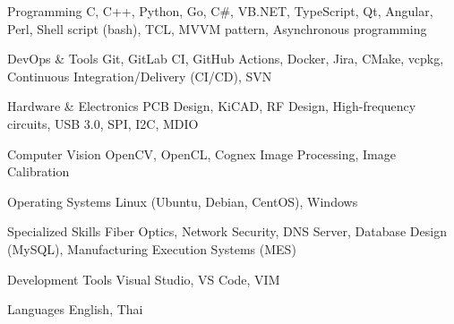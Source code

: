 
\begin{cvskills}

  \cvskill
    {Programming} %
    {C, C++, Python, Go, C\#, VB.NET, TypeScript, Qt, Angular, Perl, Shell script (bash), TCL, MVVM pattern, Asynchronous programming} %

  \cvskill
    {DevOps \& Tools} %
    {Git, GitLab CI, GitHub Actions, Docker, Jira, CMake, vcpkg, Continuous Integration/Delivery (CI/CD), SVN} %

  \cvskill
    {Hardware \& Electronics} %
    {PCB Design, KiCAD, RF Design, High-frequency circuits, USB 3.0, SPI, I2C, MDIO} %

  \cvskill
    {Computer Vision} %
    {OpenCV, OpenCL, Cognex Image Processing, Image Calibration} %

  \cvskill
    {Operating Systems} %
    {Linux (Ubuntu, Debian, CentOS), Windows} %

  \cvskill
    {Specialized Skills} %
    {Fiber Optics, Network Security, DNS Server, Database Design (MySQL), Manufacturing Execution Systems (MES)} %

  \cvskill
    {Development Tools} %
    {Visual Studio, VS Code, VIM} %

  \cvskill
    {Languages} %
    {English, Thai} %

\end{cvskills}
